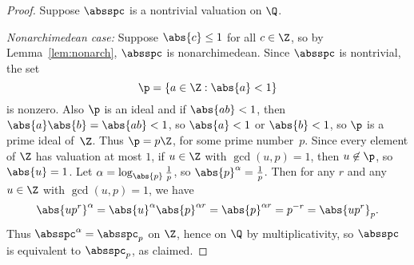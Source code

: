 \begin{proof}                                     
Suppose $\absspc$ is a nontrivial valuation on $\Q$.
\par{\em Nonarchimedean case:} 
Suppose $\abs{c}\leq 1$ for all $c\in\Z$, so by
Lemma~\ref{lem:nonarch}, $\absspc$ is nonarchimedean.  
Since $\absspc$ is nontrivial, the set 
$$
  \p=\{a\in\Z : \abs{a}<1\}
$$
is nonzero.  Also $\p$ is an ideal and if $\abs{ab}<1$,
then $\abs{a}\abs{b}=\abs{ab}<1$, so $\abs{a}<1$ or $\abs{b}<1$,
so $\p$ is a prime ideal of~$\Z$.  Thus $\p=p\Z$, for some prime
number~$p$.  Since every element of $\Z$ has valuation at most
$1$, if  $u\in\Z$ with $\gcd(u,p)=1$, then $u\not\in\p$,
so $\abs{u}=1$.  Let $\alpha=\log_{\abs{p}}\frac{1}{p}$, so 
$\abs{p}^\alpha = \frac{1}{p}$.    Then for any $r$ and any $u\in\Z$
with $\gcd(u,p)=1$, we have
$$
\abs{up^r}^{\alpha} = \abs{u}^{\alpha}\abs{p}^{\alpha r}
   = \abs{p}^{\alpha r} = p^{-r} = \abs{up^r}_p.
$$
Thus $\absspc^{\alpha} =  \absspc_p$ on $\Z$, hence on $\Q$
by multiplicativity, so $\absspc$ is equivalent to $\absspc_p$,
as claimed.


\end{proof}
